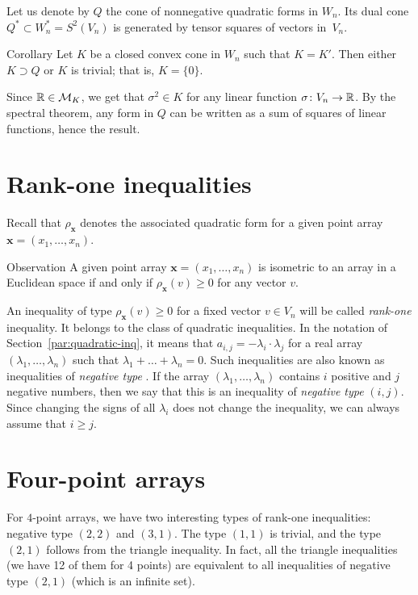 \documentclass[a4paper,10pt]{article}
\begin{document}
Let us denote by $Q$ the cone of nonnegative quadratic forms in $W_n$.
Its dual cone $Q^*\subset W_n^*=S^2(V_n)$ is generated by tensor squares of vectors in~$V_n$.

\begin{thm}{Corollary}
Let $K$ be a closed convex cone in $W_n$ such that $K=K'$.
Then either $K\supset Q$ or $K$ is trivial; that is, $K=\{0\}$.
\end{thm}

Since $\mathbb{R}\in \mathcal{M}_K$, we get that $\sigma^2\in K$ for any linear function $\sigma\colon V_n\to\mathbb{R}$.
By the spectral theorem, any form in $Q$ can be written as a sum of squares of linear functions, hence the result.
\qeds

\section{Rank-one inequalities}\label{par:rank-one}
Recall that $\rho_{\bm{x}}$ denotes the associated quadratic form for a given point array $\bm{x}=(x_1,\dots,x_n)$.

\begin{thm}{Observation}\label{obs:rank-one}
A given point array $\bm{x}=(x_1,\dots,x_n)$ is isometric to an array in a Euclidean space if and only if $\rho_{\bm{x}}(v)\ge 0$ for any vector $v$.
\end{thm}

An inequality of type $\rho_{\bm{x}}(v)\ge 0$ for a fixed vector $v\in V_n$ will be called \emph{rank-one} inequality.
It belongs to the class of quadratic inequalities.  
In the notation of Section~\ref{par:quadratic-inq}, it means that $a_{i,j}=-\lambda_i\cdot\lambda_j$ for a real array $(\lambda_1,\dots, \lambda_n)$ such that
$\lambda_1+\dots+\lambda_n=0$.
Such inequalities are also known as inequalities of \emph{negative type} \cite{deza-lauren}.
If the array $(\lambda_1,\dots, \lambda_n)$ contains $i$ positive and $j$ negative numbers,
then we say that this is an inequality of \emph{negative type} $(i,j)$.
Since changing the signs of all $\lambda_i$ does not change the inequality, we can always assume that $i\ge j$.

\section{Four-point arrays}\label{Four-point arrays}

For $4$-point arrays, we have two interesting types of rank-one inequalities: negative type $(2,2)$ and $(3,1)$.
The type $(1,1)$ is trivial, and
the type $(2,1)$ follows from the triangle inequality.
In fact, all the triangle inequalities (we have 12 of them for 4 points) are equivalent to all inequalities of negative type $(2,1)$ (which is an infinite set).
\end{document}
